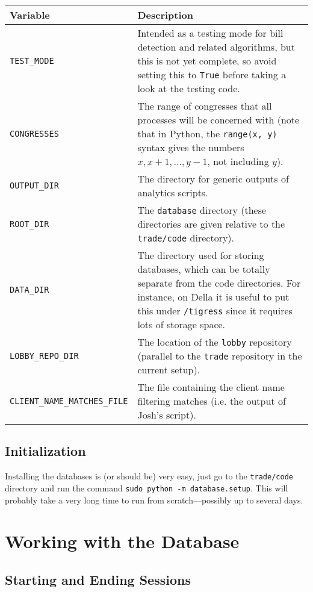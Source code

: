 \documentclass[11pt,letterpaper]{article}
\theoremstyle{plain}
\begin{document}
\begin{center}
\begin{tabular}{lp{10cm}}
    \bf{Variable} & \bf{Description} \\
    \toprule
    \texttt{TEST\_MODE} & Intended as a testing mode for bill detection and related algorithms, but this is not yet complete, so avoid setting this to \texttt{True} before taking a look at the testing code. \\
    \texttt{CONGRESSES} & The range of congresses that all processes will be concerned with (note that in Python, the \texttt{range(x, y)} syntax gives the numbers $x, x+1, \dots, y-1$, not including $y$). \\ 
    \midrule
    \texttt{OUTPUT\_DIR} & The directory for generic outputs of analytics scripts. \\
    \texttt{ROOT\_DIR} & The \texttt{database} directory (these directories are given relative to the \texttt{trade/code} directory). \\
    \texttt{DATA\_DIR} & The directory used for storing databases, which can be totally separate from the code directories. For instance, on Della it is useful to put this under \texttt{/tigress} since it requires lots of storage space. \\
    \texttt{LOBBY\_REPO\_DIR} & The location of the \texttt{lobby} repository (parallel to the \texttt{trade} repository in the current setup). \\
    \texttt{CLIENT\_NAME\_MATCHES\_FILE} & The file containing the client name filtering matches (i.e. the output of Josh's script). \\
    \bottomrule
\end{tabular}
\end{center}

\subsection{Initialization}

Installing the databases is (or should be) very easy, just go to the
\texttt{trade/code} directory and run the command \texttt{sudo python
  -m database.setup}.  This will probably take a very long time to run
from scratch---possibly up to several days.

\section{Working with the Database}

\subsection{Starting and Ending Sessions}
\end{document}
